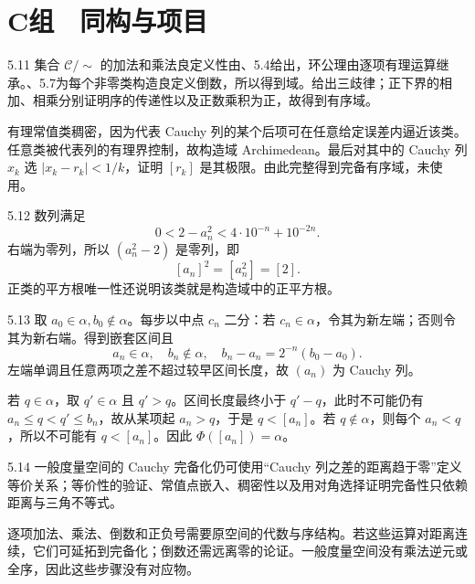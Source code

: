 \section*{C组　同构与项目}

\begin{solution}{5.11}
集合 \(\mathcal C/\sim\) 的加法和乘法良定义性由、5.4给出，环公理由逐项有理运算继承。、5.7为每个非零类构造良定义倒数，所以得到域。给出三歧律；正下界的相加、相乘分别证明序的传递性以及正数乘积为正，故得到有序域。

有理常值类稠密，因为代表 Cauchy 列的某个后项可在任意给定误差内逼近该类。任意类被代表列的有理界控制，故构造域 Archimedean。最后对其中的 Cauchy 列 \(x_k\) 选 \(|x_k-r_k|<1/k\)，证明 \([r_k]\) 是其极限。由此完整得到完备有序域，未使用。
\end{solution}

\begin{solution}{5.12}
数列满足
\[
 0<2-a_n^2<4\cdot10^{-n}+10^{-2n}.
\]
右端为零列，所以 \((a_n^2-2)\) 是零列，即
\[
 [a_n]^2=[a_n^2]=[2].
\]
正类的平方根唯一性还说明该类就是构造域中的正平方根。
\end{solution}

\begin{solution}{5.13}
取 \(a_0\in\alpha,b_0\notin\alpha\)。每步以中点 \(c_n\) 二分：若 \(c_n\in\alpha\)，令其为新左端；否则令其为新右端。得到嵌套区间且
\[
 a_n\in\alpha,\quad b_n\notin\alpha,\quad
 b_n-a_n=2^{-n}(b_0-a_0).
\]
左端单调且任意两项之差不超过较早区间长度，故 \((a_n)\) 为 Cauchy 列。

若 \(q\in\alpha\)，取 \(q'\in\alpha\) 且 \(q'>q\)。区间长度最终小于 \(q'-q\)，此时不可能仍有 \(a_n\le q<q'\le b_n\)，故从某项起 \(a_n>q\)，于是 \(q<[a_n]\)。若 \(q\notin\alpha\)，则每个 \(a_n<q\)，所以不可能有 \(q<[a_n]\)。因此 \(\Phi([a_n])=\alpha\)。
\end{solution}

\begin{solution}{5.14}
一般度量空间的 Cauchy 完备化仍可使用“Cauchy 列之差的距离趋于零”定义等价关系；等价性的验证、常值点嵌入、稠密性以及用对角选择证明完备性只依赖距离与三角不等式。

逐项加法、乘法、倒数和正负号需要原空间的代数与序结构。若这些运算对距离连续，它们可延拓到完备化；倒数还需远离零的论证。一般度量空间没有乘法逆元或全序，因此这些步骤没有对应物。
\end{solution}

